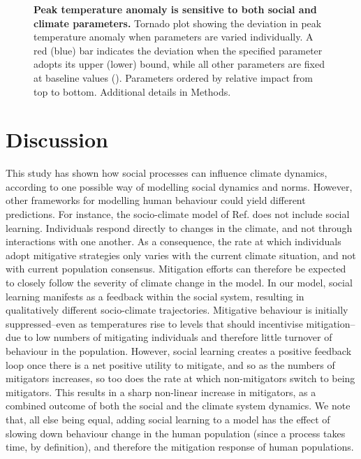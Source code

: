 \documentclass[10pt,letterpaper]{article}
\begin{document}
\begin{figure}[!ht]
\caption{{\bf Peak temperature anomaly is sensitive to both social and climate parameters.}
Tornado plot showing the deviation in peak temperature anomaly when parameters are varied individually. A red (blue) bar indicates the deviation when the specified parameter adopts its upper (lower) bound, while all other parameters are fixed at baseline values
(). Parameters ordered by relative impact from top to bottom. Additional details in Methods.}
\label{fig4}
\end{figure}


\section*{Discussion}
This study has shown how social processes can influence climate dynamics, according to one possible way of modelling social dynamics and norms. However, other frameworks for modelling human behaviour could yield different predictions.  For instance, the socio-climate model of Ref. \cite{beckage18} does not include social learning. Individuals respond directly to changes in the climate, and not through interactions with one another. As a consequence, the rate at which individuals adopt mitigative strategies only varies with the current climate situation, and not with current population consensus. Mitigation efforts can therefore be expected to closely follow the severity of climate change in the model. In our model, social learning manifests as a feedback within the social system, resulting in qualitatively different socio-climate trajectories. Mitigative behaviour is initially suppressed--even as temperatures rise to levels that should incentivise mitigation--due to low numbers of mitigating individuals and therefore little turnover of behaviour in the population. However, social learning creates a positive feedback loop once there is a net positive utility to mitigate, and so as the numbers of mitigators increases, so too does the rate at which non-mitigators switch to being mitigators. This results in a sharp non-linear increase in mitigators, as a combined outcome of both the social and the climate system dynamics. We note that, all else being equal, adding social learning to a model has the effect of slowing down behaviour change in the human population (since a process takes time, by definition), and therefore the mitigation response of human populations.
\end{document}

